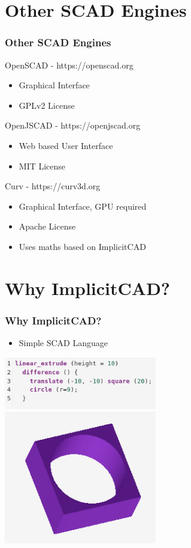 \documentclass{beamer}
\begin{document}
\section{Other SCAD Engines}
\begin{frame}
\frametitle{Other SCAD Engines}
\begin{block}{OpenSCAD - https://openscad.org}
\begin{itemize}
\item Graphical Interface
\item GPLv2 License
\end{itemize}
\end{block}
\begin{block}{OpenJSCAD - https://openjscad.org}
\begin{itemize}
\item Web based User Interface
\item MIT License
\end{itemize}
\end{block}
\begin{block}{Curv - https://curv3d.org}
\begin{itemize}
\item Graphical Interface, GPU required
\item Apache License
\item Uses maths based on ImplicitCAD
\end{itemize}
\end{block}
\end{frame}

\section{Why ImplicitCAD?}
\begin{frame}
  \frametitle{Why ImplicitCAD?}
\begin{itemize}
\item Simple SCAD Language
\end{itemize}
\includegraphics[width=0.5\textwidth, center]{website-simple_example_text.png}
\includegraphics[width=0.5\textwidth, center]{website-simple_example_graphic.png}
\end{frame}
\end{document}
